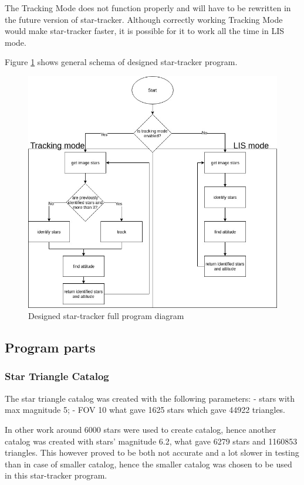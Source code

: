\documentclass[12pt,a4paper,twoside]{article}
\begin{document}
The Tracking Mode does not function properly and will have to be rewritten in the future version of star-tracker. Although correctly working Tracking Mode would make star-tracker faster, it is possible for it to work all the time in LIS mode.

Figure \ref{fig:star-tracker_diagram} shows general schema of designed star-tracker program.

\begin{figure}[!htbp]
\includegraphics[scale=0.53]{startracker_full_diagram.jpg}
\centering
\caption{Designed star-tracker full program diagram}
\label{fig:star-tracker_diagram}
\end{figure}


\subsection{Program parts}

\subsubsection{Star Triangle Catalog}

The star triangle catalog was created with the following parameters:
- stars with max magnitude 5;
- FOV 10\degree
what gave 1625 stars which gave 44922 triangles.

In other work\cite{mortari2004pyramid} around 6000 stars were used to create catalog, hence another catalog was created with stars' magnitude 6.2, what gave 6279 stars and 1160853 triangles. This however proved to be both not accurate and a lot slower in testing than in case of smaller catalog, hence the smaller catalog was chosen to be used in this star-tracker program.
\end{document}
